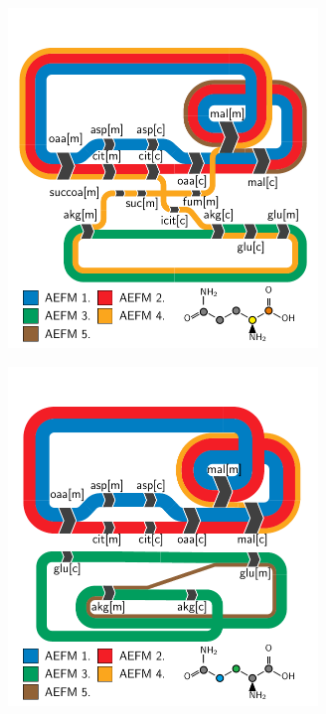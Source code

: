 \documentclass[varwidth]{standalone}
\begin{document}
\begin{figure}
\begin{subfigure}[t]{0.495\textwidth}
        \includegraphics[width=0.9\textwidth,trim={0.0cm 0.0cm 0.0cm 1.0cm},clip]{subpanels-c-f/glutamine/carbon-1-2/04-add-labels/add-labels.pdf}
    \end{subfigure}
    \begin{subfigure}[t]{0.495\textwidth}
        \vspace*{-2ex}
        \caption{}
        \centering
        \includegraphics[width=0.9\textwidth,trim={0.0cm 0.0cm 0.0cm 1.0cm},clip]{subpanels-c-f/glutamine/carbon-3-4/04-add-labels/add-labels.pdf}

\end{subfigure}
\end{figure}
\end{document}
